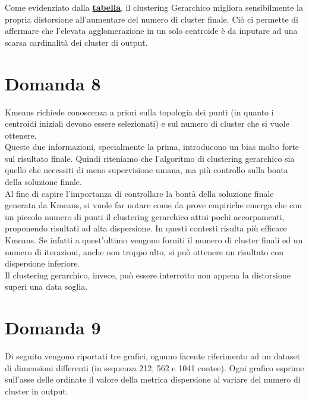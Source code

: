 \documentclass{article}
\begin{document}
\noindent Come evidenziato dalla \hyperlink{fig:test}{\textbf{tabella}}, il clustering Gerarchico migliora sensibilmente la propria distorsione all'aumentare del numero di cluster finale.
Ciò ci permette di affermare che l'elevata agglomerazione in un solo centroide è da inputare ad una scarsa cardinalità dei cluster di output.


\section*{Domanda 8}
Kmeans richiede conoscenza a priori sulla topologia dei punti (in quanto i centroidi iniziali devono essere selezionati) e sul numero di cluster che si vuole ottenere.\\
Queste due informazioni, specialmente la prima, introducono un bias molto forte sul risultato finale.
Quindi riteniamo che l'algoritmo di clustering gerarchico sia quello che necessiti di meno supervisione umana, ma più controllo sulla bonta della soluzione finale.\\
Al fine di capire l'importanza di controllare la bontà della soluzione finale generata da Kmeans, si vuole far notare come da prove empiriche emerga che con un piccolo numero di punti il clustering gerarchico attui pochi accorpamenti, proponendo risultati ad alta dispersione. In questi contesti risulta più efficace Kmeans. Se infatti a quest'ultimo vengono forniti il numero di cluster finali ed un numero di iterazioni, anche non troppo alto, si può ottenere un risultato con dispersione inferiore. \\ 
Il clustering gerarchico, invece, può essere interrotto non appena la distorsione superi una data soglia.

\section*{Domanda 9}
Di seguito vengono riportati tre grafici, ognuno facente riferimento ad un dataset di dimensioni differenti (in sequenza 212, 562 e 1041 contee). 
Ogni grafico esprime sull'asse delle ordinate il valore della metrica dispersione al variare del numero di cluster in output.\\
\end{document}
